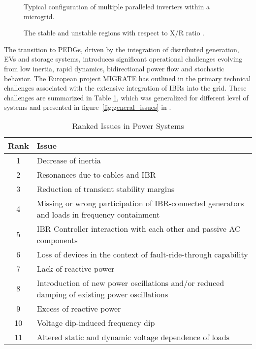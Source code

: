 \begin{figure}[ht]
    \caption{Typical configuration of multiple paralleled inverters within a microgrid.}\label{fig:multi_parallel}
\end{figure}

\begin{figure}[ht]
    \caption{The stable and unstable regions with respect to X/R ratio \cite{8242351}.}\label{fig:stability_regions}
\end{figure}

The transition to PEDGs, driven by the integration of distributed generation, EVs and storage systems, introduces significant operational challenges evolving from low inertia, rapid dynamics, bidirectional power flow and stochastic behavior. The European project MIGRATE has outlined in \autocite{MIGRATE2016} the primary technical challenges associated with the extensive integration of IBRs into the grid. These challenges are summarized in Table \ref{tab:power_system_issues}, which was generalized for different level of systems and presented in figure~\cref{fig:general_issues}  in \autocite{8809097}.

\begin{table} [htbp]
    \centering
    \begin{threeparttable}%
        \caption{Ranked Issues in Power Systems}\label{tab:power_system_issues}%
        \begin{tabular}{| c || p{13cm} |}
            \hline
            \hline
                \textbf{Rank} & \textbf{Issue} \\ \hline
                1 & Decrease of inertia \\ \hline
                2 & Resonances due to cables and IBR \\ \hline
                3 & Reduction of transient stability margins \\ \hline
                4 & Missing or wrong participation of IBR-connected generators and loads in frequency containment \\ \hline
                5 & IBR Controller interaction with each other and passive AC components \\ \hline
                6 & Loss of devices in the context of fault-ride-through capability \\ \hline
                7 & Lack of reactive power \\ \hline
                8 & Introduction of new power oscillations and/or reduced damping of existing power oscillations \\ \hline
                9 & Excess of reactive power \\ \hline
                10 & Voltage dip-induced frequency dip \\ \hline
                11 & Altered static and dynamic voltage dependence of loads \\ \hline
            \hline
        \end{tabular}
    \end{threeparttable}
\end{table}

